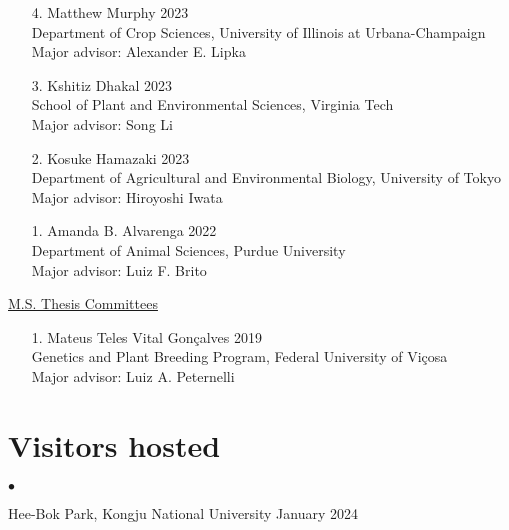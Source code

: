 \documentclass[margin,line,10pt]{res}
\newenvironment{list2}{
  \begin{list}{$\bullet$}{%
      \setlength{\itemsep}{0in}
      \setlength{\parsep}{0in} \setlength{\parskip}{0in}
      \setlength{\topsep}{0in} \setlength{\partopsep}{0in} 
      \setlength{\leftmargin}{0.2in}}}{\end{list}}
\begin{document}
\begin{resume}
\begin{enumerate}
  \item [4.] Matthew Murphy \hfill 2023 \\
  Department of Crop Sciences, University of Illinois at Urbana-Champaign \\
  Major advisor: Alexander E. Lipka 

  \vspace{0.3cm}

  \item [3.] Kshitiz Dhakal \hfill 2023 \\
  School of Plant and Environmental Sciences,  Virginia Tech \\
  Major advisor: Song Li

  \vspace{0.3cm}

  \item [2.] Kosuke Hamazaki \hfill 2023 \\
  Department of Agricultural and Environmental Biology,  University of Tokyo \\ 
  Major advisor: Hiroyoshi Iwata

  \vspace{0.3cm}

\item [1.] Amanda B. Alvarenga   \hfill 2022\\
  Department of Animal Sciences, Purdue University \\
  Major advisor: Luiz F. Brito
\end{enumerate}


\begin{flushleft}
\hspace{0.2cm} \underline{M.S. Thesis Committees}
\end{flushleft}


\begin{enumerate}
\item [1.] Mateus Teles Vital Gon\c calves  \hfill 2019 \\
  Genetics and Plant Breeding Program, Federal University of  Vi\c cosa\\
  Major advisor: Luiz A. Peternelli
\end{enumerate}


\vspace{0.5cm}
\section{\sc Visitors hosted}

\begin{list2}
\item Hee-Bok Park, Kongju National University  \hfill January 2024\\


\end{list2}
\end{resume}
\end{document}
